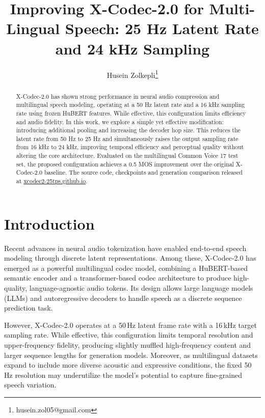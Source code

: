 \documentclass[preprint]{article}
\title{Improving X-Codec-2.0 for Multi-Lingual Speech: 25 Hz Latent Rate and 24 kHz Sampling}
\author{
Husein Zolkepli\thanks{husein.zol05@gmail.com}
}
\begin{document}
\maketitle

\begin{abstract}

X-Codec-2.0 has shown strong performance in neural audio compression and multilingual speech modeling, operating at a 50 Hz latent rate and a 16 kHz sampling rate using frozen HuBERT features. While effective, this configuration limits efficiency and audio fidelity.
In this work, we explore a simple yet effective modification: introducing additional pooling and increasing the decoder hop size. This reduces the latent rate from 50 Hz to 25 Hz and simultaneously raises the output sampling rate from 16 kHz to 24 kHz, improving temporal efficiency and perceptual quality without altering the core architecture.
Evaluated on the multilingual Common Voice 17 test set, the proposed configuration achieves a 0.5 MOS improvement over the original X-Codec-2.0 baseline. The source code, checkpoints and generation comparison released at \href{https://xcodec2-25tps.github.io}{xcodec2-25tps.github.io}.

\end{abstract}

\section{Introduction}

Recent advances in neural audio tokenization have enabled end-to-end speech modeling through discrete latent representations.  
Among these, X-Codec-2.0 has emerged as a powerful multilingual codec model, combining a HuBERT-based semantic encoder and a transformer-based codec architecture to produce high-quality, language-agnostic audio tokens.  
Its design allows large language models (LLMs) and autoregressive decoders to handle speech as a discrete sequence prediction task.  

However, X-Codec-2.0 operates at a 50\,Hz latent frame rate with a 16\,kHz target sampling rate.  
While effective, this configuration limits temporal resolution and upper-frequency fidelity, producing slightly muffled high-frequency content and larger sequence lengths for generation models.  
Moreover, as multilingual datasets expand to include more diverse acoustic and expressive conditions, the fixed 50\,Hz resolution may underutilize the model's potential to capture fine-grained speech variation.
\end{document}
